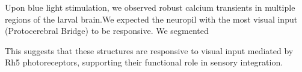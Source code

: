 Upon blue light stimulation, we observed robust calcium transients in multiple regions of the larval brain.We expected the neuropil with the most visual input (Protocerebral Bridge) to be responsive. We segmented 

 This suggests that these structures are responsive to visual input mediated by Rh5 photoreceptors, supporting their functional role in sensory integration.








